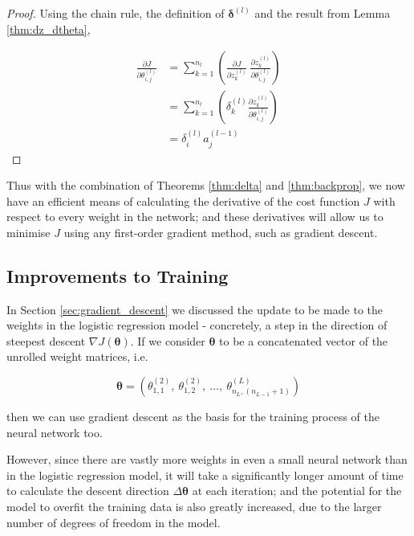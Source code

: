 \documentclass{article}[11pt]
\begin{document}
        \begin{proof}
        
            Using the chain rule, the definition of $\boldsymbol{\delta}^{(l)}$ and the result from Lemma \ref{thm:dz_dtheta},
            
            $$ \begin{aligned}
            \frac{\partial J}{\partial \theta^{(l)}_{i,j}}
            &= \sum_{k=1}^{n_l} \left( \frac{\partial J}{\partial z^{(l)}_k} \ \frac{\partial z^{(l)}_k}{\partial \theta^{(l)}_{i,j}} \right) \\
            &= \sum_{k=1}^{n_l} \left( \delta^{(l)}_k \frac{\partial z^{(l)}_k}{\partial \theta^{(l)}_{i,j}} \right) \\
            &= \delta^{(l)}_i a^{(l-1)}_j
            \end{aligned}$$
        
        \end{proof}
        
        
        Thus with the combination of Theorems \ref{thm:delta} and \ref{thm:backprop}, we now have an efficient means of calculating the derivative of the cost function $J$ with respect to every weight in the network; and these derivatives will allow us to minimise $J$ using any first-order gradient method, such as gradient descent.
        



    \subsection{Improvements to Training}
        
        In Section \ref{sec:gradient_descent} we discussed the update to be made to the weights in the logistic regression model - concretely, a step in the direction of steepest descent $\nabla J(\boldsymbol{\theta})$. If we consider $\boldsymbol{\theta}$ to be a concatenated vector of the unrolled weight matrices, i.e.
        
        $$
        \boldsymbol{\theta} = \left( \theta^{(2)}_{1,1}, \ \theta^{(2)}_{1,2}, \ \ldots, \ \theta^{(L)}_{n_L, (n_{L-1}+1)} \right)
        $$
        
        then we can use gradient descent as the basis for the training process of the neural network too.
        
        However, since there are vastly more weights in even a small neural network than in the logistic regression model, it will take a significantly longer amount of time to calculate the descent direction $\Delta \boldsymbol{\theta}$ at each iteration; and the potential for the model to overfit the training data is also greatly increased, due to the larger number of degrees of freedom in the model.
        
\end{document}
